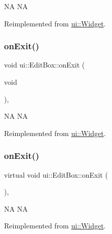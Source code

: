 NA  NA 

Reimplemented from \hyperlink{classui_1_1Widget_a9cda9b9ffbf77a8ed695e6b97b9a46cc}{ui\+::\+Widget}.

\mbox{\label{classui_1_1EditBox_a4151e7abfe84c879cc89f683c4975285}} 
\subsubsection{\texorpdfstring{on\+Exit()}{onExit()}\hspace{0.1cm}{\footnotesize\ttfamily [1/2]}}
{\footnotesize\ttfamily void ui\+::\+Edit\+Box\+::on\+Exit (\begin{DoxyParamCaption}\item[{void}]{ }\end{DoxyParamCaption})\hspace{0.3cm}{\ttfamily [override]}, {\ttfamily [virtual]}}

NA  NA 

Reimplemented from \hyperlink{classui_1_1Widget_a91cbac90873d76b6edb0e41eed5477eb}{ui\+::\+Widget}.

\mbox{\label{classui_1_1EditBox_a4c5c9db7c8b7711a719aec6a0842696b}} 
\subsubsection{\texorpdfstring{on\+Exit()}{onExit()}\hspace{0.1cm}{\footnotesize\ttfamily [2/2]}}
{\footnotesize\ttfamily virtual void ui\+::\+Edit\+Box\+::on\+Exit (\begin{DoxyParamCaption}{ }\end{DoxyParamCaption})\hspace{0.3cm}{\ttfamily [override]}, {\ttfamily [virtual]}}

NA  NA 

Reimplemented from \hyperlink{classui_1_1Widget_a91cbac90873d76b6edb0e41eed5477eb}{ui\+::\+Widget}.

\mbox{\label{classui_1_1EditBox_ad17a8fc58f78d77e47106170e6db9f39}} 
